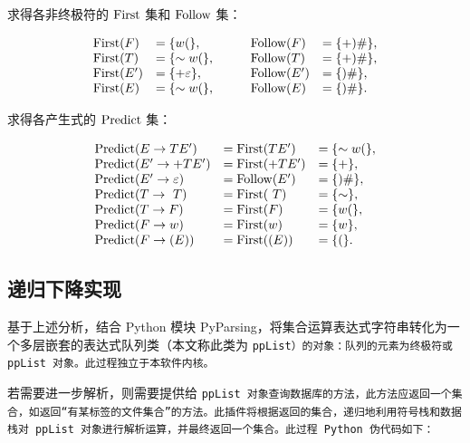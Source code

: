 求得各非终极符的 $\rm First$ 集和 $\rm Follow$ 集：

\begin{equation}
\begin{array}{llcll}
{\rm First}(F)  &= \{ w ( \}, & \quad &
{\rm Follow}(F) &= \{ + ) \# \}, \\
{\rm First}(T)  &= \{ \sim w ( \}, & \quad &
{\rm Follow}(T) &= \{ + ) \# \}, \\
{\rm First}(E') &= \{ + \varepsilon \}, & \quad &
{\rm Follow}(E')&= \{ ) \# \}, \\
{\rm First}(E)  &= \{ \sim w ( \}, & \quad &
{\rm Follow}(E) &= \{ ) \# \}.
\end{array}
\end{equation}

求得各产生式的 $\rm Predict$ 集：

\begin{equation}
\begin{array}{lll}
{\rm Predict}(E \to TE'         ) &= {\rm First} (TE'   ) &= \{ \sim w ( \},\\
{\rm Predict}(E'\to +TE'        ) &= {\rm First} (+TE'  ) &= \{ + \},\\
{\rm Predict}(E'\to \varepsilon ) &= {\rm Follow}(E'    ) &= \{ ) \# \},\\
{\rm Predict}(T \to ~T          ) &= {\rm First} (~T    ) &= \{ \sim \},\\
{\rm Predict}(T \to F           ) &= {\rm First} (F     ) &= \{ w ( \},\\
{\rm Predict}(F \to w           ) &= {\rm First} (w     ) &= \{ w \},\\
{\rm Predict}(F \to (E)         ) &= {\rm First} ((E)   ) &= \{ ( \}.
\end{array}
\end{equation}

\subsection{递归下降实现}

基于上述分析，结合 Python 模块 PyParsing，将集合运算表达式字符串转化为一个多层嵌套的表达式队列类（本文称此类为 \tt{ppList}）的对象：队列的元素为终极符或 \tt{ppList} 对象。此过程独立于本软件内核。

若需要进一步解析，则需要提供给 \tt{ppList} 对象查询数据库的方法，此方法应返回一个集合，如返回“有某标签的文件集合”的方法。此插件将根据返回的集合，递归地利用符号栈和数据栈对 \tt{ppList} 对象进行解析运算，并最终返回一个集合。此过程 Python 伪代码如下：

